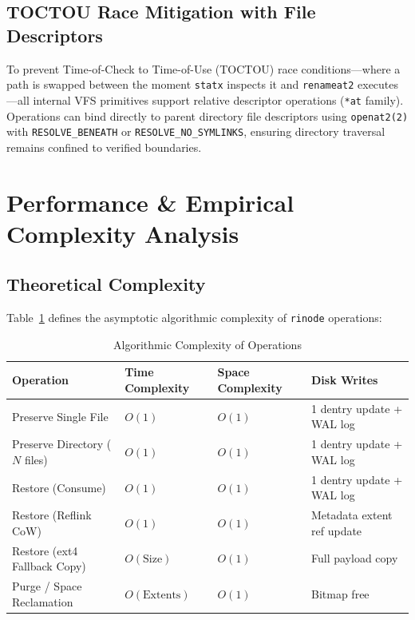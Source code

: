 \documentclass[11pt,a4paper]{article}
\begin{document}
\subsection{TOCTOU Race Mitigation with File Descriptors}
To prevent Time-of-Check to Time-of-Use (TOCTOU) race conditions—where a path is swapped between the moment \texttt{statx} inspects it and \texttt{renameat2} executes—all internal VFS primitives support relative descriptor operations (\texttt{*at} family). Operations can bind directly to parent directory file descriptors using \texttt{openat2(2)} with \texttt{RESOLVE\_BENEATH} or \texttt{RESOLVE\_NO\_SYMLINKS}, ensuring directory traversal remains confined to verified boundaries.

\section{Performance \& Empirical Complexity Analysis}

\subsection{Theoretical Complexity}
Table~\ref{tab:complexity} defines the asymptotic algorithmic complexity of \texttt{rinode} operations:

\begin{table}[h]
\centering
\small
\caption{Algorithmic Complexity of Operations}
\label{tab:complexity}
\begin{tabular}{llll}
\toprule
\textbf{Operation} & \textbf{Time Complexity} & \textbf{Space Complexity} & \textbf{Disk Writes} \\
\midrule
Preserve Single File & $O(1)$ & $O(1)$ & 1 dentry update + WAL log \\
Preserve Directory ($N$ files) & $O(1)$ & $O(1)$ & 1 dentry update + WAL log \\
Restore (Consume) & $O(1)$ & $O(1)$ & 1 dentry update + WAL log \\
Restore (Reflink CoW) & $O(1)$ & $O(1)$ & Metadata extent ref update \\
Restore (ext4 Fallback Copy) & $O(\text{Size})$ & $O(1)$ & Full payload copy \\
Purge / Space Reclamation & $O(\text{Extents})$ & $O(1)$ & Bitmap free \\
\bottomrule
\end{tabular}
\end{table}
\end{document}
